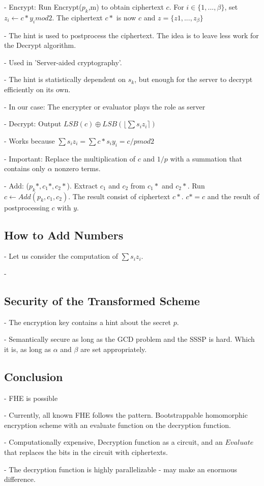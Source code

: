 \documentclass[10pt]{article}
\begin{document}
- Encrypt: Run Encrypt($p_k$,m) to obtain ciphertext $c$. For $i \in \{1, ..., \beta\}$, set $z_i \leftarrow c * y_i  mod 2$. The ciphertext $c*$ is now $c$ and $z = \{z1, ... ,z_{\beta}\}$

- The hint is used to postprocess the ciphertext. The idea is to leave less work for the Decrypt algorithm.

- Used in 'Server-aided cryptography'.

- The hint is statistically dependent on $s_k$, but enough for the server to decrypt efficiently on its own.

- In our case: The encrypter or evaluator plays the role as server

- Decrypt: Output $LSB(c) \oplus LSB(\lfloor \sum s_iz_i\rceil)$

- Works because $\sum s_iz_i = \sum c * s_iy_i = c/p mod 2$

- Important: Replace the multiplication of $c$ and $1/p$ with a summation that contains only $\alpha$ nonzero terms.

- Add: ($p_k*, c_1*, c_2*$). Extract $c_1$ and $c_2$ from $c_1*$ and $c_2*$. Run $c \leftarrow Add(p_k, c_1, c_2)$. The result consist of ciphertext $c*$. $c* = c$ and the result of postprocessing $c$ with $y$.

\subsection{How to Add Numbers}

- Let us consider the computation of $\sum s_iz_i$.

- 

\subsection{Security of the Transformed Scheme}

- The encryption key contains a hint about the secret $p$.

- Semantically secure as long as the GCD problem and the SSSP is hard. Which it is, as long as $\alpha$ and $\beta$ are set appropriately.

\subsection{Conclusion}

- FHE is possible

- Currently, all known FHE follows the pattern. Bootstrappable homomorphic encryption scheme with an evaluate function on the decryption function.

- Computationally expensive, Decryption function as a circuit, and an $Evaluate$ that replaces the bits in the circuit with ciphertexts.

- The decryption function is highly parallelizable - may make an enormous difference. 
\end{document}

